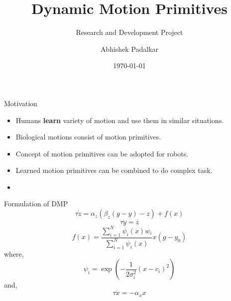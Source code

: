 \documentclass{beamer}
\author[]{Abhishek Padalkar}
\title{Dynamic Motion Primitives}
\subtitle{Research and Development Project}
\institute[HBRS]{Hochschule Bonn-Rhein-Sieg}
\date{\today}
\begin{document}
	{
	\begin{frame}
	\titlepage
	\end{frame}
	}
	
	\begin{frame}{Motivation}
		\begin{itemize}
			\item Humans \textbf{learn} variety of motion and use them in similar situations. 
			\item Biological motions consist of motion primitives. 
			\item Concept of motion primitives can be adopted for robots. 
			\item Learned motion primitives can be combined to do complex task. 
			\item 
		\end{itemize}
	\end{frame}
	
	
	\begin{frame}{Formulation of DMP}
		\begin{equation}\label{DMP_1}
		\tau\dot{z} = \alpha_{z}(\beta_{z}(g - y) - z) + f(x)
		\end{equation}
		\begin{equation}\label{DMP_2}
		\tau \dot{y} = z
		\end{equation}
		\begin{equation}\label{forcing_term}
		f(x) = \frac{\sum_{i=1}^{N}\psi_{i}(x)w_{i}}{\sum_{i=1}^{N}\psi_{i}(x)}x(g - y_{0})
		\end{equation}
		where,
		\begin{equation}\label{psi}
		\psi_{i} = \exp(-{\frac{1}{2\sigma_{i}^{2}}(x - c_{i})^{2}})
		\end{equation}
		and,
		\begin{equation}\label{canonical}
		\tau \dot{x} = -\alpha_{x}x
		\end{equation}
	\end{frame}
	
\end{document}
